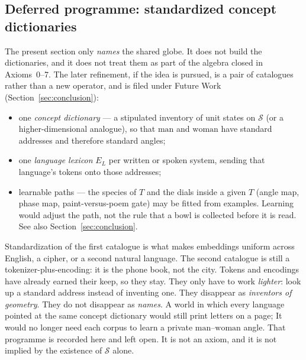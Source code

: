 \documentclass[12pt, a4paper]{article}
\begin{document}
\subsection{Deferred programme: standardized concept dictionaries}
\label{subsec:standard_dictionaries}
The present section only \emph{names} the shared globe. It does not
build the dictionaries, and it does not treat them as part of the
algebra closed in Axioms~0--7. The later refinement, if the idea is
pursued, is a pair of catalogues rather than a new operator, and is
filed under Future Work (Section~\ref{sec:conclusion}):
\begin{itemize}
    \item one \emph{concept dictionary} --- a stipulated inventory of
          unit states on $\mathcal{S}$ (or a higher-dimensional
          analogue), so that $\mathrm{man}$ and $\mathrm{woman}$ have
          standard addresses and therefore standard angles;
    \item one \emph{language lexicon} $E_L$ per written or spoken
          system, sending that language's tokens onto those addresses;
    \item learnable paths --- the species of $T$ and the dials inside
          a given $T$ (angle map, phase map, paint-versus-poem gate)
          may be fitted from examples. Learning would adjust the path,
          not the rule that a bowl is collected before it is read.
          See also Section~\ref{sec:conclusion}.
\end{itemize}
Standardization of the first catalogue is what makes embeddings
uniform across English, a cipher, or a second natural language.
The second catalogue is still a tokenizer-plus-encoding: it is the
phone book, not the city. Tokens and encodings have already earned
their keep, so they stay. They only have to work \emph{lighter}:
look up a standard address instead of inventing one. They disappear as
\emph{inventors of geometry}. They do not disappear as \emph{names}.
A world in which every language pointed at the same concept
dictionary would still print letters on a page; It would no longer need each 
corpus to learn a private $\mathrm{man}$--$\mathrm{woman}$ angle. 
That programme is recorded here and left open. It is not an
axiom, and it is not implied by the existence of $\mathcal{S}$ alone.
\end{document}
